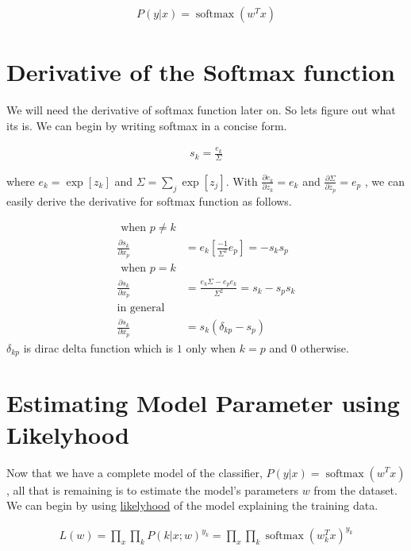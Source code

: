 \documentclass[10pt]{article}
\begin{document}
$$  \begin{aligned}
P(y|x) = \operatorname{softmax}(w^Tx)
\end{aligned} $$


\section{Derivative of the Softmax function}
We will need the derivative of softmax function later on. So lets figure out what its is. We can begin by writing softmax in a concise form.

$$  \begin{aligned}
s_k = \frac{e_k}{\Sigma}
\end{aligned} $$

where $e_k = \operatorname{exp}[z_k]$ and $\Sigma = \sum_j\operatorname{exp}[z_j]$. With $\frac{\partial e_k}{\partial z_k} = e_k$ and $\frac{\partial \Sigma}{\partial z_p} = e_p $ , we can easily derive the derivative for softmax function as follows.

$$ \begin{aligned}
\text{ when $p \neq k$}
\\
\frac{\partial s_k}{\partial x_p} &= e_k\left[ \frac{-1}{\Sigma^2} e_p\right] = -s_ks_p
\\
\text{ when $p = k$}
\\
\frac{\partial s_k}{\partial x_p} &= 
\frac{  e_k \Sigma-  e_p e_k}{\Sigma^2} = s_k-s_ps_k
\\
\text{in general}
\\
\frac{\partial s_k}{\partial x_p} &= s_k(\delta_{kp} - s_p)
\end{aligned} $$
$\delta_{kp}$ is dirac delta function which is $1$ only when $k=p$ and $0$ otherwise.



\section{Estimating Model Parameter using Likelyhood}

Now that we have a complete model of the classifier, $P(y|x) = \operatorname{softmax}(w^Tx) $,  all that is remaining is to estimate the model's parameters $w$ from the dataset. We can begin by using \href{https://en.wikipedia.org/wiki/Maximum_likelihood_estimation}{likelyhood} of the model explaining the training data.  

$$  \begin{aligned}
L(w) = \prod_x \prod_k P(k|x;w)^{y_k} = \prod_x \prod_k \operatorname{softmax}(w_k^Tx)^{y_k} 
\end{aligned} $$
\end{document}
